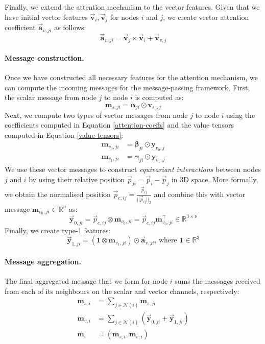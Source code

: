 Finally, we extend the attention mechanism to the vector features. Given that we have initial vector features $\vec{\mathbf{v}}_i, \vec{\mathbf{v}}_j$ for nodes $i$ and $j$, we create vector attention coefficient $\vec{\mathbf{a}}_{v, ji}$ as follows:
\begin{equation}
    \vec{\mathbf{a}}_{v, ji} = \vec{\mathbf{v}}_j \times \vec{\mathbf{v}}_i + \vec{\mathbf{v}}_{v, j}
\end{equation}

\paragraph{Message construction.}
Once we have constructed all necessary features for the attention mechanism, we can compute the incoming messages for the message-passing framework. First, the scalar message from node $j$ to node $i$ is computed as:
\begin{equation}
    \mathbf{m}_{s, ji} = \mathbf{\alpha}_{ji}\odot\mathbf{v}_{s_0, j}
\end{equation}
Next, we compute two types of vector messages from node $j$ to node $i$ using the coefficients computed in Equation \ref{attention-coeffs} and the value tensors computed in Equation \ref{value-tensors}:
\begin{align}
    \mathbf{m}_{v_0, ji} &= \mathbf{\beta}_{ji}\odot \mathbf{y}_{v_0, j}\\
    \mathbf{m}_{v_1, ji} &= \mathbf{\gamma}_{ji}\odot \mathbf{y}_{v_1, j}    
\end{align}
We use these vector messages to construct \textit{equivariant interactions} between nodes $j$ and $i$ by using their relative position $\vec{p}_{ji} = \vec{p}_i - \vec{p}_j$ in 3D space. More formally, we obtain the normalised position $\vec{p}_{e,ij} = \frac{\vec{p}_{ij}}{||\vec{p}_{ij}||_2}$ and combine this with vector message $\mathbf{m}_{v_0,ji}\in\mathbb{R}^n$ as:
\begin{equation}
    \vec{\mathbf{y}}_{0, ji} = \vec{p}_{e,ij}\otimes\mathbf{m}_{v_0,ji} = \vec{p}_{e,ij}\mathbf{m}_{v_0, ji}^{\top} \in \mathbb{R}^{3\times\nu}
\label{position-cross-product}
\end{equation}
Finally, we create type-1 features:
\begin{equation}
    \vec{\mathbf{y}}_{1, ji} = (\mathbf{1}\otimes\mathbf{m}_{v_1, ji})\odot \vec{\mathbf{a}}_{v, ji}\text{, where }\mathbf{1}\in\mathbb{R}^3
\end{equation}
\paragraph{Message aggregation.}
The final aggregated message that we form for node $i$ sums the messages received from each of its neighbours on the scalar and vector channels, respectively:
\begin{align}
    \mathbf{m}_{s, i} &= \sum_{j\in\mathcal{N}(i)}\mathbf{m}_{s, ji}\\
    \mathbf{m}_{v, i} &= \sum_{j\in\mathcal{N}(i)}(\vec{\mathbf{y}}_{0, ji} + \vec{\mathbf{y}}_{1, ji}) \\
    \mathbf{m}_i &= (\mathbf{m}_{s, i}, \mathbf{m}_{v, i})
\end{align}

